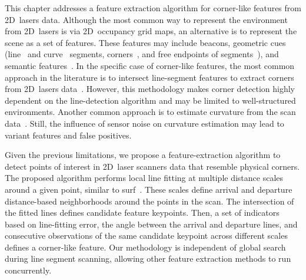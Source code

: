 This chapter addresses a feature extraction algorithm for corner-like features
from 2D~lasers data. Although the most common way to represent the environment
from 2D~lasers is via 2D~occupancy grid maps, an alternative is to represent
the scene as a set of features. These features may include
beacons\cite{sobreira:icarsc:2015}, geometric cues
(line~\cite{castellanos:mfi:1996,roumeliotis-bekey:iros:2000,mohamed:isprs-arxiv:2016,liu:sensors:2023,nunez:icra:2006,vazquez-martin:sensors:2009,feng:aici:2009,pfister:icra:2003,gao:ijars:2018}
and curve~\cite{falomir:prl:2013,nunez:icra:2006,vazquez-martin:sensors:2009,feng:aici:2009} segments,
corners~\cite{castellanos:mfi:1996,roumeliotis-bekey:iros:2000,jung:tits:2008,falomir:prl:2013,mohamed:isprs-arxiv:2016,lin:yac:2017,liu:electronics:2022,liu:sensors:2023,nunez:icra:2006,vazquez-martin:sensors:2009,feng:aici:2009,certad:andescon:2012},
and free endpoints of segments~\cite{castellanos:mfi:1996,liu:electronics:2022,vazquez-martin:sensors:2009,certad:andescon:2012}),
and semantic features~\cite{jung:tits:2008,qu:robio:2018,roumeliotis-bekey:iros:2000}.
In the specific case of corner-like features, the most common approach
in the literature is to intersect line-segment features to extract corners
from 2D~lasers data~\cite{castellanos:mfi:1996,roumeliotis-bekey:iros:2000,jung:tits:2008,falomir:prl:2013,fernandez-moral:ijrr:2015,mohamed:isprs-arxiv:2016,zhao:icsess:2016,lin:yac:2017,qu:robio:2018,liu:electronics:2022,liu:sensors:2023}.
However, this methodology makes corner detection highly dependent on
the line-detection algorithm and may be limited to well-structured environments.
Another common approach is to estimate curvature from the scan
data~\cite{nunez:icra:2006,vazquez-martin:sensors:2009,feng:aici:2009,certad:andescon:2012}.
Still, the influence of sensor noise on curvature estimation may lead
to variant features and false positives.

Given the previous limitations, we propose a feature-extraction algorithm
to detect points of interest in 2D~laser scanners data
that resemble physical corners. The proposed algorithm performs
local line fitting at multiple distance scales around a given point,
similar to \gls{surf}~\cite{bay:eccv:2006}. These scales define arrival and
departure distance-based neighborhoods around the points in the scan.
The intersection of the fitted lines defines candidate feature keypoints.
Then, a set of indicators based on line-fitting error, the angle between
the arrival and departure lines, and consecutive observations of the same
candidate keypoint across different scales defines a corner-like feature.
Our methodology is independent of global search during line segment scanning, allowing other feature extraction methods to run concurrently.

